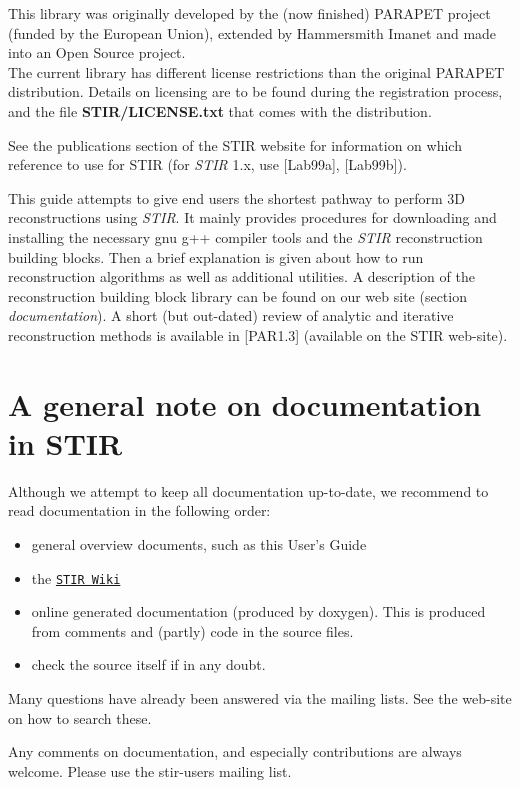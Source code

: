 \documentclass{article}
\def\R2Lurl#1#2{\mbox{\href{#1}{\tt #2}}}
\begin{document}
This library was originally developed by the (now finished) PARAPET 
project (funded by the European Union), extended by Hammersmith 
Imanet and made into an Open Source project. \\
The current library has different license restrictions than the 
original PARAPET distribution. Details on licensing are to be 
found during the registration process, and the file \textbf{STIR/LICENSE.txt} 
that comes with the distribution. 

See the publications section of the STIR website for information on which reference
to use for STIR (for \textit{STIR} 1.x, use [Lab99a], [Lab99b]).



This guide attempts to give end users the shortest pathway to 
perform 3D reconstructions using \textit{STIR}. It mainly provides 
procedures for downloading and installing the necessary gnu g++ 
compiler tools and the \textit{STIR} reconstruction building blocks. 
Then a brief explanation is given about how to run reconstruction 
algorithms as well as additional utilities. A description of 
the reconstruction building block library can be found on our 
web site (section \textit{documentation}). A short (but out-dated) review of analytic 
and iterative reconstruction methods is available in [PAR1.3] 
(available on the STIR web-site).

\section{
A general note on documentation in STIR}

Although we attempt to keep all documentation up-to-date, we 
recommend to read documentation in the following order:
\begin{itemize}
\item general overview documents, such as this User's Guide
\item the \R2Lurl{http://sourceforge.net/apps/mediawiki/stir}{STIR Wiki}
\item 
online generated documentation (produced by doxygen). This is 
produced from comments and (partly) code in the source files.
\item check the source itself if in any doubt.
\end{itemize}
Many questions have already been answered via the mailing lists. See the
web-site on how to search these.

Any comments on documentation, and especially contributions are 
always welcome. Please use the stir-users mailing list.
\end{document}
